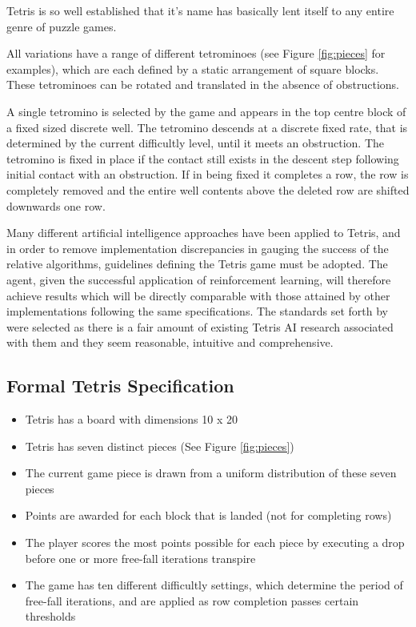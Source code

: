 \documentclass{rucsthesis}
\begin{document}
Tetris is so well established that it's name has basically lent itself to any entire genre of puzzle games.

 All variations have a range of different tetrominoes (see Figure \ref{fig:pieces} for examples), which are each defined by a static arrangement of square blocks. These tetrominoes can be rotated and translated in the absence of obstructions. 
 
A  single tetromino is selected by the game and appears in the top centre block of a fixed sized discrete well. The tetromino descends at a discrete fixed rate, that is determined by the current difficultly level, until it meets an obstruction. The tetromino is fixed in place if the contact still exists in the descent step following initial contact with an obstruction. If in being fixed it completes a row, the row is completely removed and the entire well contents above the deleted row are shifted downwards one row.

Many different artificial intelligence approaches have been applied to Tetris, and in order to remove implementation discrepancies in gauging the success of the relative algorithms, guidelines defining the Tetris game must be adopted. The agent, given the successful application of reinforcement learning, will therefore achieve results which will be directly comparable with those attained by other implementations following the same specifications. The standards set forth by \cite{tetstand} were selected as there is a fair amount of existing Tetris AI research associated with them and they seem reasonable, intuitive and comprehensive.

\subsection{Formal Tetris Specification \citep{tetstand}} 
\begin{itemize}
\item{Tetris has a board with dimensions 10 x 20}
\item{Tetris has seven distinct pieces (See Figure \ref{fig:pieces})}
\item{The current game piece is drawn from a uniform distribution of these seven pieces}
\item{Points are awarded for each block that is landed (not for completing rows)}
\item{The player scores the most points possible for each piece by executing a drop before one or more free-fall iterations transpire}
\item{The game has ten different difficultly settings, which determine the period of free-fall iterations, and are applied as row completion passes certain thresholds}
\end{itemize}
\end{document}
